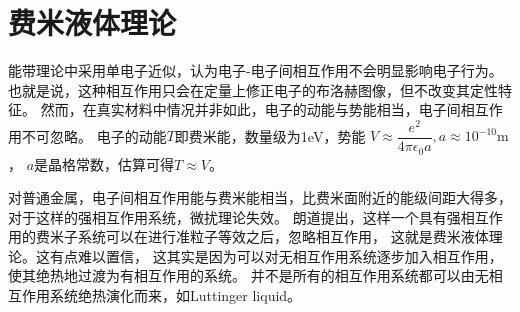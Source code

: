 \documentclass{article}
\begin{document}
\section{费米液体理论}
能带理论中采用单电子近似，认为电子-电子间相互作用不会明显影响电子行为。
也就是说，这种相互作用只会在定量上修正电子的布洛赫图像，但不改变其定性特征。
然而，在真实材料中情况并非如此，电子的动能与势能相当，电子间相互作用不可忽略。
电子的动能$T$即费米能，数量级为1eV，势能
$V\approx\dfrac{e^2}{4\pi\epsilon_0a}, a\approx 10^{-10}\mathrm{m}$，
$a$是晶格常数，估算可得$T\approx V$。

对普通金属，电子间相互作用能与费米能相当，比费米面附近的能级间距大得多，
对于这样的强相互作用系统，微扰理论失效。
朗道提出，这样一个具有强相互作用的费米子系统可以在进行准粒子等效之后，忽略相互作用，
这就是费米液体理论。这有点难以置信，
这其实是因为可以对无相互作用系统逐步加入相互作用，
使其绝热地过渡为有相互作用的系统。
并不是所有的相互作用系统都可以由无相互作用系统绝热演化而来，如Luttinger liquid。
\end{document}
